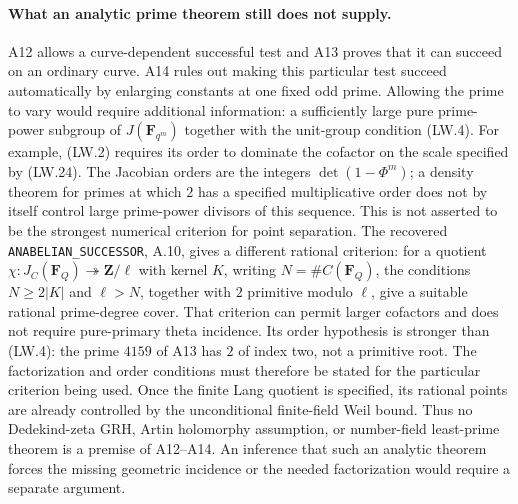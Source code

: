 \paragraph{What an analytic prime theorem still does not supply.}
A12 allows a curve-dependent successful test and A13 proves that
it can succeed on an ordinary curve.  A14 rules out making this
particular test succeed automatically by enlarging constants at one
fixed odd prime.  Allowing the prime to vary would require additional
information: a sufficiently large pure prime-power subgroup of
$J(\mathbf F_{q^m})$ together with the unit-group condition (LW.4).
For example, (LW.2) requires its order to dominate the cofactor on
the scale specified by (LW.24).
The Jacobian orders are the integers
$\det(1-\Phi^m)$; a density theorem for primes at which $2$ has a
specified multiplicative order does not by itself control large
prime-power divisors of this sequence.
This is not asserted to be the strongest numerical criterion for
point separation.  The recovered \texttt{ANABELIAN\_SUCCESSOR},
A.10, gives a different rational criterion: for a quotient
$\chi:J_C(\mathbf F_Q)\twoheadrightarrow\mathbf Z/\ell$ with
kernel $K$, writing $N=\#C(\mathbf F_Q)$, the conditions
$N\ge2|K|$ and $\ell>N$, together with $2$ primitive modulo $\ell$,
give a suitable rational prime-degree cover.  That criterion can
permit larger cofactors and does not require pure-primary theta
incidence.  Its order hypothesis is stronger than (LW.4):
the prime $4159$ of A13 has $2$ of index two, not a primitive root.
The factorization and order conditions must therefore be stated
for the particular criterion being used.
Once the finite Lang quotient is specified, its rational points
are already controlled by the unconditional finite-field Weil bound.
Thus no Dedekind-zeta GRH, Artin holomorphy assumption, or
number-field least-prime theorem is a premise of A12--A14.
An inference that such an analytic theorem forces the missing
geometric incidence or the needed factorization would require a
separate argument.
